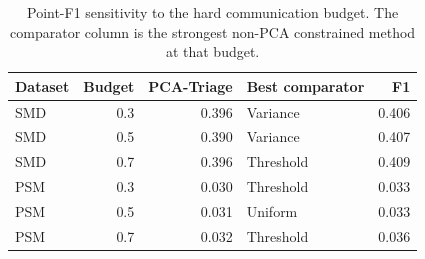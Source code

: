 \documentclass[pdflatex,sn-vancouver-num]{sn-jnl}
\theoremstyle{thmstyleone}
\begin{document}
\begin{table}[t]
\centering
\caption{Point-F1 sensitivity to the hard communication budget. The comparator column is the strongest non-PCA constrained method at that budget.}
\begin{tabular}{@{}lrrlr@{}}
\toprule
Dataset & Budget & PCA-Triage & Best comparator & F1 \\
\midrule
SMD & 0.3 & 0.396 & Variance & 0.406 \\
SMD & 0.5 & 0.390 & Variance & 0.407 \\
SMD & 0.7 & 0.396 & Threshold & 0.409 \\
\addlinespace
PSM & 0.3 & 0.030 & Threshold & 0.033 \\
PSM & 0.5 & 0.031 & Uniform & 0.033 \\
PSM & 0.7 & 0.032 & Threshold & 0.036 \\
\bottomrule
\end{tabular}
\label{tab:budget-sensitivity}
\end{table}

\begin{table}[t]
\centering
\caption{Run-separated TEP results at 50\% bandwidth, with the fault onset labeled within each run. Values are mean $\pm$ standard deviation across five joint experimental seeds.}
\label{tab:causal-tep}
\end{table}
\end{document}
